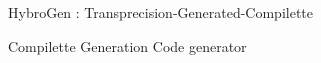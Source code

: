 \begin{Frame}{HybroGen : Transprecision-Generated-Compilette}
  \begin{block}{Compilette Generation Code generator}
    
  \end{block}

\end{Frame}
